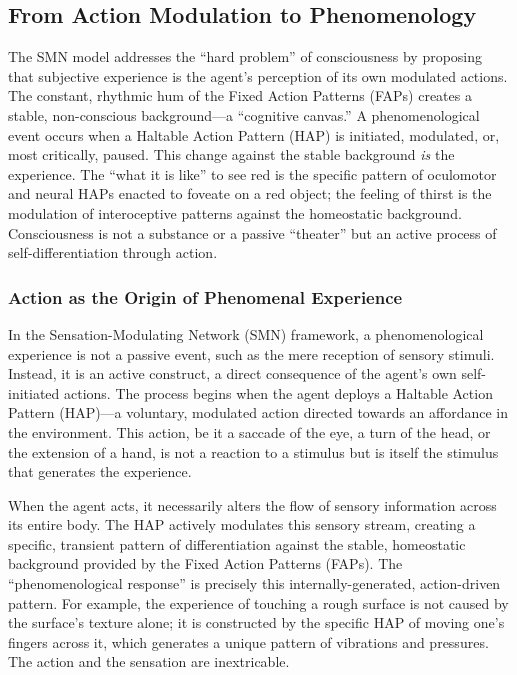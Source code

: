 \subsection{From Action Modulation to Phenomenology}
\label{subsec:phenomenology}
The SMN model addresses the ``hard problem'' of consciousness by proposing that subjective experience is the agent's perception of its own modulated actions. The constant, rhythmic hum of the Fixed Action Patterns (FAPs) creates a stable, non-conscious background—a ``cognitive canvas.'' A phenomenological event occurs when a Haltable Action Pattern (HAP) is initiated, modulated, or, most critically, paused. This change against the stable background \textit{is} the experience. The ``what it is like'' to see red is the specific pattern of oculomotor and neural HAPs enacted to foveate on a red object; the feeling of thirst is the modulation of interoceptive patterns against the homeostatic background. Consciousness is not a substance or a passive ``theater'' but an active process of self-differentiation through action.

\subsubsection{Action as the Origin of Phenomenal Experience}
\label{ssubsec:action_origin}
In the Sensation-Modulating Network (SMN) framework, a phenomenological experience is not a passive event, such as the mere reception of sensory stimuli. Instead, it is an active construct, a direct consequence of the agent's own self-initiated actions. The process begins when the agent deploys a Haltable Action Pattern (HAP)—a voluntary, modulated action directed towards an affordance in the environment. This action, be it a saccade of the eye, a turn of the head, or the extension of a hand, is not a reaction to a stimulus but is itself the stimulus that generates the experience.

When the agent acts, it necessarily alters the flow of sensory information across its entire body. The HAP actively modulates this sensory stream, creating a specific, transient pattern of differentiation against the stable, homeostatic background provided by the Fixed Action Patterns (FAPs). The ``phenomenological response'' is precisely this internally-generated, action-driven pattern. For example, the experience of touching a rough surface is not caused by the surface's texture alone; it is constructed by the specific HAP of moving one's fingers across it, which generates a unique pattern of vibrations and pressures. The action and the sensation are inextricable.

